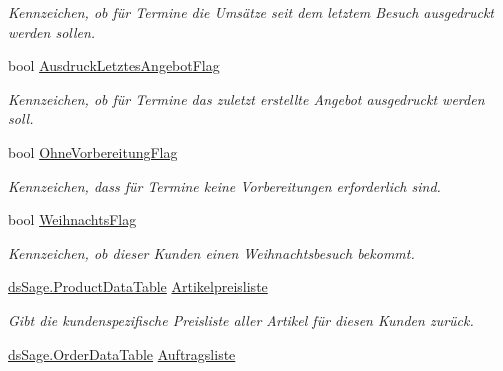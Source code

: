 \begin{DoxyCompactItemize}
\begin{DoxyCompactList}\small\item\em Kennzeichen, ob für Termine die Umsätze seit dem letztem Besuch ausgedruckt werden sollen. \end{DoxyCompactList}\item 
bool \hyperlink{class_products_1_1_model_1_1_entities_1_1_kunde_a02a8dffa9aeb939bed01620606e4062c}{Ausdruck\+Letztes\+Angebot\+Flag}
\begin{DoxyCompactList}\small\item\em Kennzeichen, ob für Termine das zuletzt erstellte Angebot ausgedruckt werden soll. \end{DoxyCompactList}\item 
bool \hyperlink{class_products_1_1_model_1_1_entities_1_1_kunde_af0241c99ba6ea75e9869d710e2639955}{Ohne\+Vorbereitung\+Flag}
\begin{DoxyCompactList}\small\item\em Kennzeichen, dass für Termine keine Vorbereitungen erforderlich sind. \end{DoxyCompactList}\item 
bool \hyperlink{class_products_1_1_model_1_1_entities_1_1_kunde_a86514421c1d2101e3cc443884ce17f7f}{Weihnachts\+Flag}
\begin{DoxyCompactList}\small\item\em Kennzeichen, ob dieser Kunden einen Weihnachtsbesuch bekommt. \end{DoxyCompactList}\item 
\hyperlink{class_products_1_1_data_1_1ds_sage_1_1_product_data_table}{ds\+Sage.\+Product\+Data\+Table} \hyperlink{class_products_1_1_model_1_1_entities_1_1_kunde_aa0491591c035906cadc24896793c7ff5}{Artikelpreisliste}
\begin{DoxyCompactList}\small\item\em Gibt die kundenspezifische Preisliste aller Artikel für diesen Kunden zurück. \end{DoxyCompactList}\item 
\hyperlink{class_products_1_1_data_1_1ds_sage_1_1_order_data_table}{ds\+Sage.\+Order\+Data\+Table} \hyperlink{class_products_1_1_model_1_1_entities_1_1_kunde_a8f1621a1b3b645252bde29488a18eccd}{Auftragsliste}

\end{DoxyCompactItemize}
